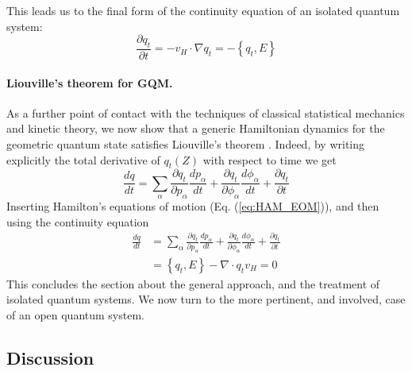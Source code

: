 \documentclass[draft,nofootinbib,pre,twocolumn,showpacs,showkeys,preprintnumbers,floatfix]{revtex4-1}
\newcommand{\1}{\mathbbm{1}}
\begin{document}
This leads us to the final form of the continuity equation of an isolated quantum system:
\begin{equation}
\frac{\partial q_t}{\partial t} = - v_H \cdot \nabla q_t = -\left\{ q_t, E \right\}
\end{equation}

\paragraph*{Liouville's theorem for GQM.} As a further point of contact with the techniques of classical 
statistical mechanics and kinetic theory, we now show that a generic Hamiltonian dynamics for the 
geometric quantum state satisfies Liouville's theorem \cite{Soto}. Indeed, by writing explicitly the total 
derivative of $q_t(Z)$ with respect to time we get 
\begin{equation}
\frac{d q}{d t} = \sum_\alpha \frac{\partial q_t}{\partial p_\alpha} \frac{dp_\alpha}{dt}+\frac{\partial q_t}{\partial \phi_\alpha} \frac{d\phi_\alpha}{dt} + \frac{\partial q_t}{\partial t}
\end{equation}
Inserting Hamilton's equations of motion (Eq. (\ref{eq:HAM_EOM})), and then using the continuity equation
\begin{align}
\frac{d q}{d t} &= \sum_\alpha \frac{\partial q_t}{\partial p_\alpha} \frac{dp_\alpha}{dt}+\frac{\partial q_t}{\partial \phi_\alpha} \frac{d\phi_\alpha}{dt} + \frac{\partial q_t}{\partial t}\nonumber \\
& = \left\{ q_t, E\right\} - \nabla \cdot q_t v_H = 0
\end{align}
This concludes the section about the general approach, and the treatment of isolated quantum systems.
We now turn to the more pertinent, and involved, case of an open quantum system.

\subsection*{Discussion}
\end{document}
